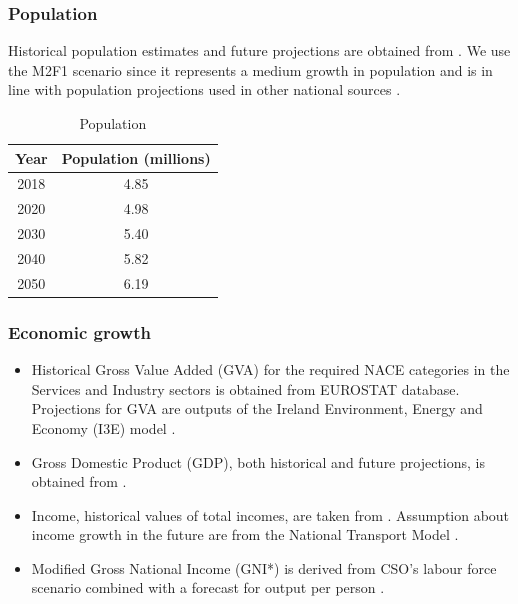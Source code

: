 \documentclass[gmd,manuscript]{copernicus}
\begin{document}
\subsubsection{Population}
Historical population estimates and future projections are obtained from \citet{CentralStatisticsOffice2020}. We use the M2F1 scenario since it represents a medium growth in population and is in line with population projections used in other national sources \citep{Yakut2020}.

\begin{table}[htbp]
 \centering
 \footnotesize
 \caption{Population}
 \begin{tabular}{cc}
 \hline
 Year & Population (millions) \\
 \hline
 2018 & 4.85 \\
 2020 & 4.98 \\
 2030 & 5.40 \\
 2040 & 5.82 \\
 2050 & 6.19 \\
 \hline
 \end{tabular}%
 \label{tab:pop}%
\end{table}%


\subsubsection{Economic growth}
\begin{itemize}

 \item Historical Gross Value Added (GVA) for the required NACE categories in the Services and Industry sectors is obtained from EUROSTAT database. Projections for GVA are outputs of the Ireland Environment, Energy and Economy (I3E) model \citep{Yakut2020}.
 
 \item Gross Domestic Product (GDP), both historical and future projections, is obtained from \citet{OECD2018}. 
 
 \item Income, historical values of total incomes, are taken from \citet{CSOincome}. Assumption about income growth in the future are from the National Transport Model \citep{AECOMIrelandLimited2019}. 
 
 \item Modified Gross National Income (GNI*) is derived from CSO's labour force scenario combined with a forecast for output per person \citep{cso_lf}. 

\end{itemize}
\end{document}
